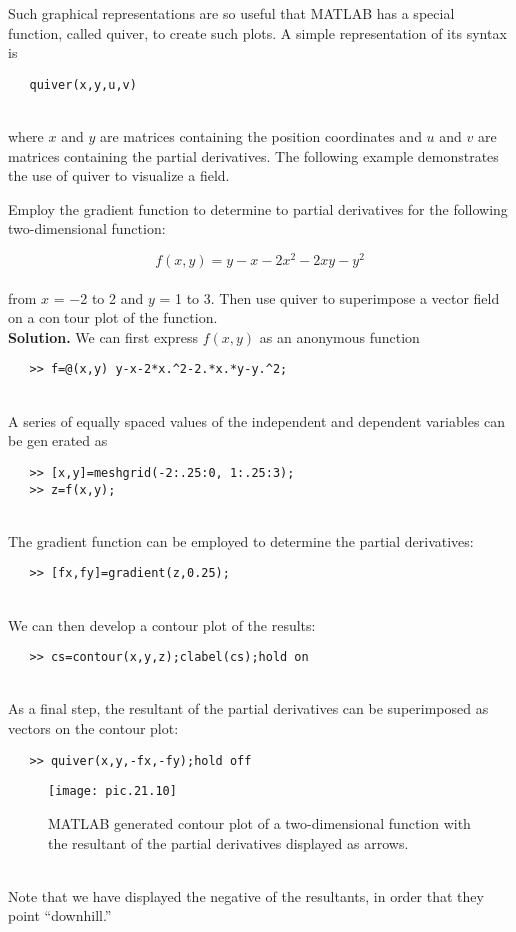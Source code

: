 Such graphical representations are so useful that MATLAB has a special function,
called quiver, to create such plots. A simple representation of its syntax is
\begin{verbatim}
   quiver(x,y,u,v)
\end{verbatim}\\
where $x$ and $y$ are matrices containing the position coordinates and $u$ and $v$ are matrices
containing the partial derivatives. The following example demonstrates the use of quiver
to visualize a field.

Employ the gradient function to determine to partial derivatives for the following
two-dimensional function:

	$$f(x,y) = y-x-2x^{2} - 2xy - y^{2}$$\\
from $x$ = −2 to 2 and $y$ = 1 to 3. Then use quiver to superimpose a vector field on a contour plot of the function.\\
\textbf{Solution.} We can first express $f(x, y)$ as an anonymous function
\begin{verbatim}
   >> f=@(x,y) y-x-2*x.^2-2.*x.*y-y.^2;
\end{verbatim}\\
A series of equally spaced values of the independent and dependent variables can be generated as
\begin{verbatim}
   >> [x,y]=meshgrid(-2:.25:0, 1:.25:3);
   >> z=f(x,y);
\end{verbatim}\\
The gradient function can be employed to determine the partial derivatives:
\begin{verbatim}
   >> [fx,fy]=gradient(z,0.25);
\end{verbatim}\\
We can then develop a contour plot of the results:
\begin{verbatim}
   >> cs=contour(x,y,z);clabel(cs);hold on
\end{verbatim}\\
As a final step, the resultant of the partial derivatives can be superimposed as vectors on the
contour plot:
\begin{verbatim}
   >> quiver(x,y,-fx,-fy);hold off
\end{verbatim}

\begin{figure}[hbt!]
	\caption{\textsf{MATLAB generated contour plot of a two-dimensional function with the resultant of the partial
derivatives displayed as arrows.}} \hline \vspace{0.2in}
\centering
	\texttt{[image: pic.21.10]}
	\label{pic.21.10}
\end{figure}\\
Note that we have displayed the negative of the resultants, in order that they point 
“downhill.”


